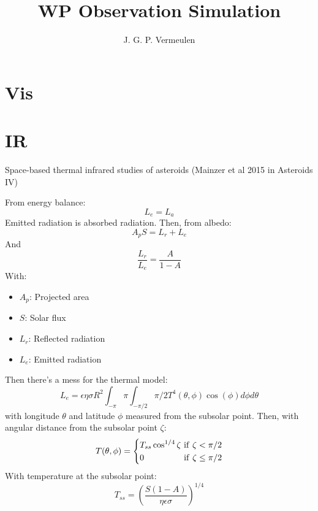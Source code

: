 \documentclass[a4paper,10pt]{article}
\title{WP Observation Simulation}
\author{J. G. P. Vermeulen}
\begin{document}
\maketitle

\section{Vis}

\section{IR}
Space-based thermal infrared studies of asteroids (Mainzer et al 2015 in Asteroids IV)

From energy balance:
\begin{equation}
 L_e = L_a
\end{equation}
Emitted radiation is absorbed radiation. Then, from albedo:
\begin{equation}
 A_pS = L_r + L_e
\end{equation}
And
\begin{equation}
 \frac{L_r}{L_e} = \frac{A}{1-A}
\end{equation}
With:
\begin{itemize}
 \item $A_p$: Projected area
 \item $S$: Solar flux
 \item $L_r$: Reflected radiation
 \item $L_e$: Emitted radiation
\end{itemize}
Then there's a mess for the thermal model:
\begin{equation}
 L_e = \epsilon \eta \sigma R^2 \int _{-\pi}{\pi} \int _{-\pi/2}{\pi/2} T^4(\theta,\phi) \cos (\phi) d \phi d \theta
\end{equation}
with longitude $\theta$ and latitude $\phi$ measured from the subsolar point. Then, with angular distance from the subsolar point $\zeta$:
\begin{equation}
 T(\theta, \phi) = \begin{dcases}T_{ss} \cos ^{1/4} \zeta~\mathrm{if}~\zeta < \pi/2 \\ 0~~~~~~~~~~~~~~\mathrm{if}~ \zeta \leq \pi/2 \end{dcases} 
\end{equation}
With temperature at the subsolar point:
\begin{equation}
 T_{ss} = \left(\frac{S(1-A)}{\eta \epsilon \sigma} \right)^{1/4}
\end{equation}
\end{document}
